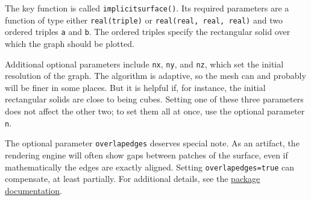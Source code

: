 \documentclass{article}
\begin{document}
The key function is called \lstinline!implicitsurface()!. Its required parameters
are a function of type either \lstinline!real(triple)! or
\lstinline!real(real, real, real)! and two ordered triples \lstinline!a! and
\lstinline!b!. The ordered triples specify the rectangular solid over which the
graph should be plotted.

Additional optional parameters include \lstinline!nx!, \lstinline!ny!, and
\lstinline!nz!, which set the initial resolution of the graph. The algorithm
is adaptive, so the mesh can and probably will be finer in some places. But
it is helpful if, for instance, the initial rectangular solids are close to being
cubes. Setting one of these three parameters does not affect the other two;
to set them all at once, use the optional parameter \lstinline!n!.

The optional parameter \lstinline!overlapedges! deserves special note. As an
artifact, the rendering engine will often show gaps between patches of
the surface, even if mathematically the edges are exactly aligned. Setting
\lstinline!overlapedges=true! can compensate, at least partially. For additional
details, see the \href{http://github.com/charlesstaats/smoothcontour3/blob/master/smoothcontour3.pdf}{package documentation}.
\end{document}
